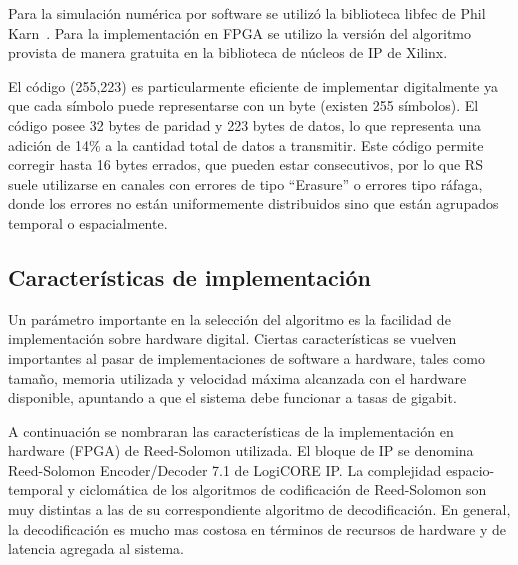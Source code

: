 Para la simulación numérica por software se utilizó la biblioteca libfec de Phil Karn~\cite{libfec}. Para la implementación en FPGA se utilizo la versión del algoritmo provista de manera gratuita en la biblioteca de núcleos de IP de Xilinx.

El código (255,223) es particularmente eficiente de implementar digitalmente ya que cada símbolo puede representarse con un byte (existen 255 símbolos). El código posee 32 bytes de paridad y 223 bytes de datos, lo que representa una adición de 14\% a la cantidad total de datos a transmitir. Este código permite corregir hasta 16 bytes errados, que pueden estar consecutivos, por lo que RS suele utilizarse en canales con errores de tipo ``Erasure'' o errores tipo ráfaga, donde los errores no están uniformemente distribuidos sino que están agrupados temporal o espacialmente.


\subsection{Características de implementación}
Un parámetro importante en la selección del algoritmo es la facilidad de implementación sobre hardware digital. Ciertas características se vuelven importantes al pasar de implementaciones de software a hardware, tales como tamaño, memoria utilizada y velocidad máxima alcanzada con el hardware disponible, apuntando a que el sistema debe funcionar a tasas de gigabit.

A continuación se nombraran las características de la implementación en hardware (FPGA) de Reed-Solomon utilizada.
El bloque de IP se denomina Reed-Solomon Encoder/Decoder 7.1 de LogiCORE IP. La complejidad espacio-temporal y ciclomática de los algoritmos de codificación de Reed-Solomon son muy distintas a las de su correspondiente algoritmo de decodificación. En general, la decodificación es mucho mas costosa en términos de recursos de hardware y de latencia agregada al sistema.

